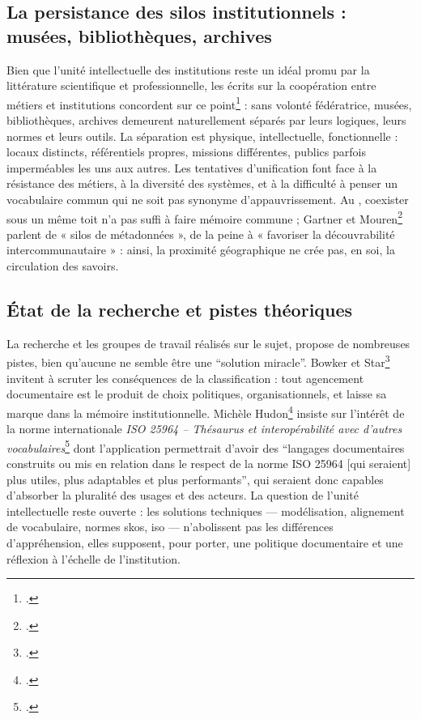\subsection{La persistance des silos institutionnels : musées, bibliothèques, archives}

Bien que l'unité intellectuelle des institutions reste un idéal promu par la littérature scientifique et professionnelle, les écrits sur la coopération entre métiers et institutions concordent sur ce point\footcite{gartnerArchivesMuseumsLibraries2019,rossini-paquetBibliothequesMuseesQuellesa,yarrowBibliothequesPubliquesArchives2008a} : sans volonté fédératrice, musées, bibliothèques, archives demeurent naturellement séparés par leurs logiques, leurs normes et leurs outils. La séparation est physique, intellectuelle, fonctionnelle : locaux distincts, référentiels propres, missions différentes, publics parfois imperméables les uns aux autres. Les tentatives d’unification font face à la résistance des métiers, à la diversité des systèmes, et à la difficulté à penser un vocabulaire commun qui ne soit pas synonyme d’appauvrissement. Au \mae, coexister sous un même toit n’a pas suffi à faire mémoire commune ; Gartner et Mouren\footcite{gartnerArchivesMuseumsLibraries2019} parlent de « silos de métadonnées », de la peine à « favoriser la découvrabilité intercommunautaire » : ainsi, la proximité géographique ne crée pas, en soi, la circulation des savoirs.

\subsection{État de la recherche et pistes théoriques}

La recherche et les groupes de travail réalisés sur le sujet, propose de nombreuses pistes, bien qu'aucune ne semble être une \enquote{solution miracle}. Bowker et Star\footcite{bowkerArrangerChosesConsequences2023} invitent à scruter les conséquences de la classification : tout agencement documentaire est le produit de choix politiques, organisationnels, et laisse sa marque dans la mémoire institutionnelle. Michèle Hudon\footcite{hudonISO25964Pour2012a} insiste sur l'intérêt de la norme internationale \textit{ISO 25964 -- Thésaurus et interopérabilité avec d'autres vocabulaires}\footcite{ISO25964120112011} dont l'application permettrait d'avoir des \enquote{langages documentaires construits ou mis en relation dans le respect de la norme ISO 25964 [qui seraient] plus utiles, plus adaptables et plus performants}, qui seraient donc capables d’absorber la pluralité des usages et des acteurs. La question de l’unité intellectuelle reste ouverte : les solutions techniques — modélisation, alignement de vocabulaire, normes \gls{skos}, \gls{iso} — n’abolissent pas les différences d’appréhension, elles supposent, pour porter, une politique documentaire et une réflexion à l'échelle de l'institution.

